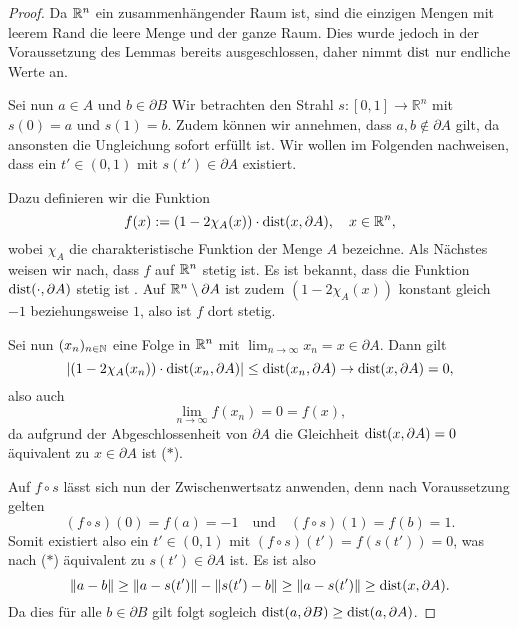 \begin{proof}
  Da $\mathbb{R}^n$ ein zusammenhängender Raum ist, sind die einzigen Mengen mit leerem Rand die leere Menge und der ganze Raum.
  Dies wurde jedoch in der Voraussetzung des Lemmas bereits ausgeschlossen, daher nimmt $\operatorname{dist}$ nur endliche Werte an.

  Sei nun $a \in A$ und $b \in \partial B$
  Wir betrachten den Strahl $s \colon [0,1] \to \mathbb{R}^n$ mit $s(0) = a$ und $s(1) = b$.
  Zudem können wir annehmen, dass $a,b \not\in \partial A$ gilt, da ansonsten die Ungleichung sofort erfüllt ist.
  Wir wollen im Folgenden nachweisen, dass ein $t' \in (0,1)$ mit $s(t') \in \partial A$ existiert.

  Dazu definieren wir die Funktion
  $$
  f(x) := (1 - 2\chi_A(x)) \cdot \operatorname{dist}(x, \partial A), \quad x \in \mathbb{R}^n,
  $$
  wobei $\chi_A$ die charakteristische Funktion der Menge $A$ bezeichne.
  Als Nächstes weisen wir nach, dass $f$ auf $\mathbb{R}^n$ stetig ist.
  Es ist bekannt, dass die Funktion $\operatorname{dist}(\cdot, \partial A)$ stetig ist \cite[S.14]{koenigsberger2004ana2}.
  Auf $\mathbb{R}^n \setminus \partial A$ ist zudem $(1 - 2\chi_A(x))$ konstant gleich $-1$ beziehungsweise $1$, also ist $f$ dort stetig.

  Sei nun $(x_n)_{n \in \mathbb{N}}$ eine Folge in $\mathbb{R}^n$ mit $\lim_{n \to \infty} x_n = x \in \partial A$.
  Dann gilt
  $$
  |(1 - 2\chi_A(x_n)) \cdot \operatorname{dist}(x_n, \partial A)| 
  \leq \operatorname{dist}(x_n,\partial A)
  \to \operatorname{dist}(x,\partial A) 
  = 0,
  $$
  also auch 
  $$
  \lim_{n \to \infty} f(x_n) = 0 = f(x),
  $$
  da aufgrund der Abgeschlossenheit von $\partial A$ die Gleichheit $\operatorname{dist}(x,\partial A) = 0$ äquivalent zu $x \in \partial A$ ist ($\ast$).

  Auf $f \circ s$ lässt sich nun der Zwischenwertsatz anwenden, denn nach Voraussetzung gelten
  $$
  (f \circ s)(0) = f(a) = -1 \quad\text{und}\quad (f \circ s)(1) = f(b) = 1.
  $$
  Somit existiert also ein $t' \in (0,1)$ mit $(f\circ s)(t') = f(s(t')) = 0$, was nach ($\ast$) äquivalent zu $s(t') \in \partial A$ ist.
  Es ist also
  $$
  \lVert a - b \rVert \geq \lVert a - s(t') \rVert - \lVert s(t') - b \rVert \geq \lVert a - s(t') \rVert \geq \operatorname{dist}(x,\partial A).
  $$
  Da dies für alle $b \in \partial B$ gilt folgt sogleich $ \operatorname{dist}(a, \partial B) \geq \operatorname{dist}(a, \partial A)$.
\end{proof}


